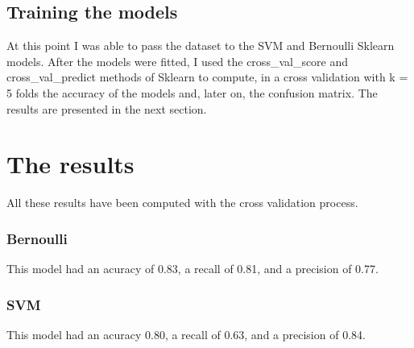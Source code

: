 \documentclass[12pt]{article}
\begin{document}
\subsection{Training the models}
At this point I was able to pass the dataset to the SVM and Bernoulli Sklearn models. After the models were fitted, I used the cross\_val\_score and cross\_val\_predict methods of Sklearn to compute, in a cross validation with k = 5 folds the accuracy of the models and, later on, the confusion matrix. The results are presented in the next section.

\section{The results}
All these results have been computed with the cross validation process. 
\subsubsection{Bernoulli}
This model had an acuracy of 0.83, a recall of 0.81, and a precision of 0.77.

\subsubsection{SVM}
This model had an acuracy 0.80, a recall of 0.63, and a precision of 0.84.
\end{document}
